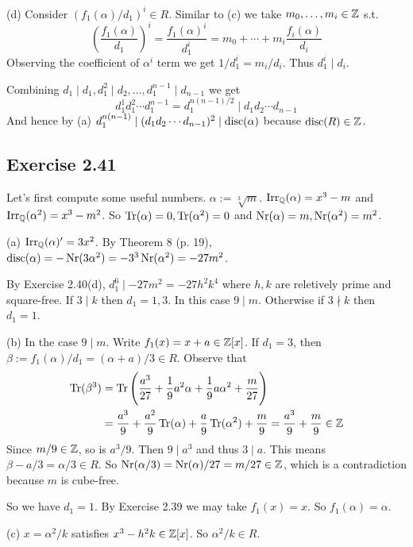 \documentclass[../Marcus.tex]{subfiles}
\begin{document}
(d) Consider $(f_1(\alpha)/d_1)^i\in R$. Similar to (c) we take $m_0,\ldots,m_i\in\mathbb{Z}$ s.t. $$\left(\frac{f_1(\alpha)}{d_1}\right)^i=\frac{f_1(\alpha)^i}{d_1^i}=m_0+\cdots+m_i\frac{f_i(\alpha)}{d_i}$$ Observing the coefficient of $\alpha^i$ term we get $1/d_1^i=m_i/d_i$. Thus $d_1^i\mid d_i$.

Combining $d_1\mid d_1,d_1^2\mid d_2,\ldots,d_1^{n-1}\mid d_{n-1}$ we get $$d_1^1d_1^2\cdots d_1^{n-1}=d_1^{n(n-1)/2}\mid d_1d_2\cdots d_{n-1}$$ And hence by (a) $d_1^{n(n-1)}\mid (d_1d_2\cdots d_{n-1})^2\mid \operatorname{disc}(\alpha)$ because $\operatorname{disc}(R)\in\mathbb{Z}$.

\subsection*{Exercise 2.41}

Let's first compute some useful numbers. $\alpha:=\sqrt[3]{m}$. $\operatorname{Irr}_{\mathbb{Q}}(\alpha)=x^3-m$ and $\operatorname{Irr}_{\mathbb{Q}}(\alpha^2)=x^3-m^2$. So $\operatorname{Tr}(\alpha)=0,\operatorname{Tr}(\alpha^2)=0$ and $\operatorname{Nr}(\alpha)=m,\operatorname{Nr}(\alpha^2)=m^2$.

(a) $\operatorname{Irr}_{\mathbb{Q}}(\alpha)'=3x^2$. By Theorem 8 (p. 19), $\operatorname{disc}(\alpha)=-\operatorname{Nr}(3\alpha^2)=-3^3\operatorname{Nr}(\alpha^2)=-27m^2$.

By Exercise 2.40(d), $d_1^6\mid -27m^2=-27h^2k^4$ where $h,k$ are reletively prime and square-free. If $3\mid k$ then $d_1=1,3$. In this case $9\mid m$. Otherwise if $3\nmid k$ then $d_1=1$.

(b) In the case $9\mid m$. Write $f_1(x)=x+a\in\mathbb{Z}[x]$. If $d_1=3$, then $\beta:=f_1(\alpha)/d_1=(\alpha+a)/3\in R$. Observe that
\begin{align*}
    \operatorname{Tr}(\beta^3) &= \operatorname{Tr}\left(\frac{a^3}{27}+\frac{1}{9}a^2\alpha+\frac{1}{9}a\alpha^2+\frac{m}{27}\right) \\ 
    &= \frac{a^3}{9}+\frac{a^2}{9}\operatorname{Tr}(\alpha)+\frac{a}{9}\operatorname{Tr}(\alpha^2)+\frac{m}{9} = \frac{a^3}{9}+\frac{m}{9} \in\mathbb{Z}
\end{align*}
Since $m/9\in\mathbb{Z}$, so is $a^3/9$. Then $9\mid a^3$ and thus $3\mid a$. This means $\beta-a/3=\alpha/3\in R$. So $\operatorname{Nr}(\alpha/3)=\operatorname{Nr}(\alpha)/27=m/27\in\mathbb{Z}$, which is a contradiction because $m$ is cube-free.

So we have $d_1=1$. By Exercise 2.39 we may take $f_1(x)=x$. So $f_1(\alpha)=\alpha$.

(c) $x=\alpha^2/k$ satisfies $x^3-h^2k\in\mathbb{Z}[x]$. So $\alpha^2/k\in R$.
\end{document}
